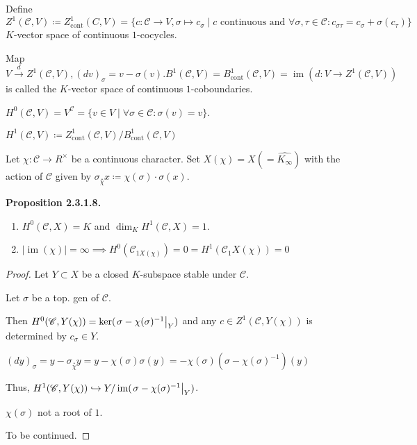 \documentclass{article}
\theoremstyle{definition}
\numberwithin{theorem}{subsection}
\begin{document}
    Define \(Z^1(\mathscr{C} , V) \coloneqq Z^1_{\text{cont}}(C,V) = \{ c: \mathscr{C} \to V, \sigma \mapsto c_\sigma \mid c \text{ continuous and } \forall \sigma ,\tau \in \mathscr{C} : c_{\sigma \tau} = c_\sigma +\sigma(c_{\tau}) \} \) \(K\)-vector space of continuous \(1\)-cocycles.

    Map \(V \xrightarrow{d} Z^1(\mathscr{C} , V), (dv)_\sigma = v - \sigma(v). B^1(\mathscr{C},V) = B^1_{\text{cont}}(\mathscr{C} , V) = \operatorname{im} (d: V \to Z^1(\mathscr{C} , V)) \) is called the \(K\)-vector space of continuous \(1\)-coboundaries.
    
    \(H^0(\mathscr{C}, V) = V^{\mathscr{C}} = \{ v\in V \mid \forall \sigma \in \mathscr{C}: \sigma(v) = v \}\).

    \(H^1(\mathscr{C}, V) \coloneqq Z^1_{\text{cont}} (\mathscr{C}, V) / B^1_{\text{cont}}(\mathscr{C} , V)\)
    
    Let \(\chi : \mathscr{C} \to R^\times\) be a continuous character. Set \(X(\chi) = X (=\widehat{K_\infty})\) with the action of \(\mathscr{C}\) given by \(\sigma \underset{\chi}{.} x \coloneqq \chi(\sigma) \cdot \sigma(x)\).

    \textbf{Proposition 2.3.1.8.}

    \begin{enumerate}[label=\alph*)]
        \item \(H^0(\mathscr{C}, X) = K\) and \(\dim_K H^1(\mathscr{C}, X) = 1\).
        
        \item \(\vert \operatorname{im} (\chi) \vert = \infty \implies H^0(\mathscr{C}_{1X(\chi)}) = 0 = H^1(\mathscr{C}_1 X(\chi)) = 0\)  
    \end{enumerate} 

    \begin{proof}
        Let \(Y \subset X\) be a closed \(K\)-subspace stable under \(\mathscr{C}\).
        
        Let \(\sigma\) be a top. gen of \(\mathscr{C}\).

        Then \(H^0 (\mathscr{C}, Y(\chi)) = \ker (\eval{\sigma - \chi(\sigma) ^{-1}}_Y)\) and any \(c\in Z^1(\mathscr{C}, Y(\chi))\) is determined by \(c_\sigma \in Y\).

        \((dy)_\sigma = y - \sigma \underset{\chi}{.} y = y - \chi(\sigma) \sigma(y) = - \chi(\sigma)(\sigma - \chi(\sigma)^{-1})(y)\)

        Thus, \(H^1(\mathscr{C}, Y(\chi)) \hookrightarrow Y / \operatorname{im} (\eval{\sigma - \chi(\sigma) ^{-1}}_Y)\).

        \(\chi(\sigma)\) not a root of \(1\).

        To be continued.
    \end{proof}
\end{document}

